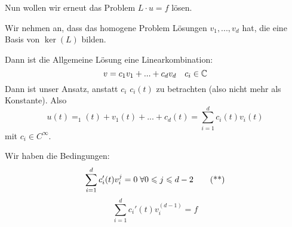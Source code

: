 \documentclass[main.tex]{subfiles}
\begin{document}
\begin{enumerate}
    Nun wollen wir erneut das Problem $L \cdot u = f$ lösen.

    Wir nehmen an, dass das homogene Problem Lösungen $v_1,...,v_d$ hat, die eine Basis von $\ker(L)$ bilden.

    Dann ist die Allgemeine Lösung eine Linearkombination:
    $$v = c_1 v_1 + ... + c_d v_d  \quad c_i \in \mathbb{C}$$
    Dann ist unser Ansatz, anstatt $c_i$ $c_i(t)$ zu betrachten (also nicht mehr als Konstante). Also
    \begin{equation*}
      u(t) = _1(t) + v_1 (t) + ... + c_d(t) = \sum \limits_{i=1}^d c_i(t)v_i(t) \tag{*}
    \end{equation*}
    mit $c_i \in C^\infty$.

    Wir haben die Bedingungen:
    \begin{equation*}
      \sum \limits_{i=1}^d c_i'(t) v_i^{j} = 0 \;\forall 0 \leqslant j \leqslant d-2 \tag{**}
    \end{equation*}
    \begin{equation*}
      \sum \limits_{i=1}^d c_i'(t) v_i^{(d-1)} = f \tag{***}
    \end{equation*}


\end{enumerate}
\end{document}
